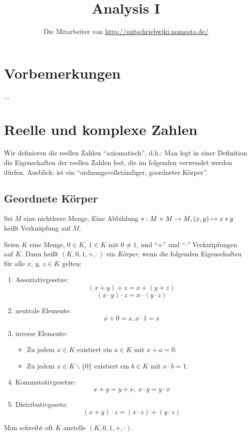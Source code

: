 \documentclass[12pt]{scrreprt}
\author{Die Mitarbeiter von \url{http://mitschriebwiki.nomeata.de/}}
\title{Analysis I}
\begin{document}
\maketitle

\tableofcontents

\setcounter{chapter}{-1}
\chapter{Vorbemerkungen}
...

\chapter{Reelle und komplexe Zahlen}
\label{cha:zahlen}
Wir definieren die reellen Zahlen "`axiomatisch"', d.h.: Man legt in einer Definition die 
Eigenschaften der reellen Zahlen fest, die im folgenden verwendet werden dürfen.
Ausblick:  ist ein "`ordnungsvollständiger, geordneter Körper"'.

\section{Geordnete Körper}
\label{sec:zahlen.geordnete-koerper}
\begin{dfn*}
Sei $M$ eine nichtleere Menge. Eine Abbildung $\ast: M\times M \rightarrow M, (x, y) 
\mapsto x \ast y$ heißt Verknüpfung auf $M$.
\end{dfn*}

\begin{dfn}
\label{dfn:zahlen.koerper}
Seien $K$ eine Menge, $0 \in K$, $1 \in K$ mit $0 \ne 1$, und "`$+$"' und "`$\cdot$"' Verknüpfungen auf 
$K$. Dann heißt $(K, 0, 1, +, \cdot)$ ein \emph{Körper}, wenn die folgenden Eigenschaften für alle 
$x$, $y$, $z \in K$ gelten:

\begin{enumerate}
\item Assoziativgesetze:
\[(x + y) + z = x + (y + z)\]
\[(x \cdot y) \cdot z = x \cdot (y \cdot z)\]

\item neutrale Elemente:
\[x + 0 = x, x \cdot 1 = x\]

\item inverse Elemente:
\begin{itemize}
  \item Zu jedem $x \in K$ existiert ein $a \in K$ mit $x + a = 0$.
  \item Zu jedem $x \in K \backslash \{0\}$ existiert ein $b \in K$ mit $x \cdot b = 1$.
\end{itemize}

\item Kommutativgesetze:
\[x + y = y + x,\ x \cdot y = y \cdot x\]

\item Distributivgesetz:
\[(x + y) \cdot z = (x \cdot z) + (y \cdot z)\]
\end{enumerate}

Man schreibt oft $K$ anstelle $(K, 0, 1, +, \cdot)$.
\end{dfn}
\end{document}
